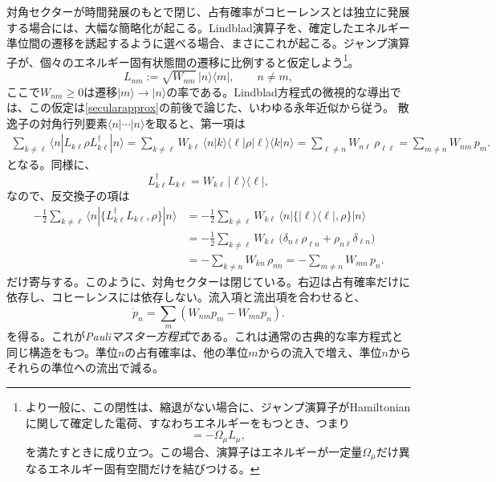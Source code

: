 \documentclass[a4paper,11pt,oneside]{article}
\theoremstyle{definition}
\numberwithin{equation}{section}
\begin{document}
対角セクターが時間発展のもとで閉じ、占有確率がコヒーレンスとは独立に発展する場合には、大幅な簡略化が起こる。Lindblad演算子を、確定したエネルギー準位間の遷移を誘起するように選べる場合、まさにこれが起こる。ジャンプ演算子が、個々のエネルギー固有状態間の遷移に比例すると仮定しよう\footnote{より一般に、この閉性は、縮退がない場合に、ジャンプ演算子がHamiltonianに関して確定した電荷、すなわちエネルギーをもつとき、つまり
\begin{equation}
[H,L_\mu]=-\Omega_\mu L_\mu ,
\end{equation}
を満たすときに成り立つ。この場合、演算子はエネルギーが一定量$\Omega_\mu$だけ異なるエネルギー固有空間だけを結びつける。
}。
\begin{equation}\label{chargedjumps}
L_{nm} := \sqrt{W_{nm}}\,|n\rangle\langle m| ,
\qquad n\neq m ,
\end{equation}
ここで$W_{nm}\geq 0$は遷移$|m\rangle\to |n\rangle$の率である。Lindblad方程式の微視的な導出では、この仮定は\eqref{secularapprox}の前後で論じた、いわゆる永年近似から従う。
散逸子の対角行列要素$\langle n|\cdots|n\rangle$を取ると、第一項は
\begin{align}
\sum_{k\neq \ell}\langle n|L_{k\ell}\rho L_{k\ell}^\dagger|n\rangle=
\sum_{k\neq \ell}
W_{k\ell}\,
\langle n|k\rangle\langle \ell|\rho|\ell\rangle\langle k|n\rangle
=
\sum_{\ell\neq n} W_{n\ell}\,\rho_{\ell\ell}
=
\sum_{m\neq n} W_{nm}\,p_m .
\end{align}
となる。同様に、
\begin{equation}
L_{k\ell}^\dagger L_{k\ell}
=
W_{k\ell}\,|\ell\rangle\langle \ell| ,
\end{equation}
なので、反交換子の項は
\begin{align}
-\frac12
\sum_{k\neq \ell}
\langle n|\{L_{k\ell}^\dagger L_{k\ell},\rho\}|n\rangle
&=
-\frac12
\sum_{k\neq \ell}
W_{k\ell}\,
\langle n|\{|\ell\rangle\langle\ell|,\rho\}|n\rangle
\nonumber\\
&=
-\frac12
\sum_{k\neq \ell}
W_{k\ell}\,
\bigl(\delta_{n\ell}\rho_{\ell n}+\rho_{n\ell}\delta_{\ell n}\bigr)
\nonumber\\
&=
-\sum_{k\neq n} W_{kn}\,\rho_{nn}
=
-\sum_{m\neq n} W_{mn}\,p_n .
\end{align}
だけ寄与する。このように、対角セクターは閉じている。右辺は占有確率だけに依存し、コヒーレンスには依存しない。流入項と流出項を合わせると、
\begin{equation}\label{PauliME}
\dot p_n
=
\sum_m
\left(
W_{nm} p_m - W_{mn} p_n
\right) .
\end{equation}
を得る。これが\textit{Pauliマスター方程式}である。これは通常の古典的な率方程式と同じ構造をもつ。準位$n$の占有確率は、他の準位$m$からの流入で増え、準位$n$からそれらの準位への流出で減る。
\end{document}
